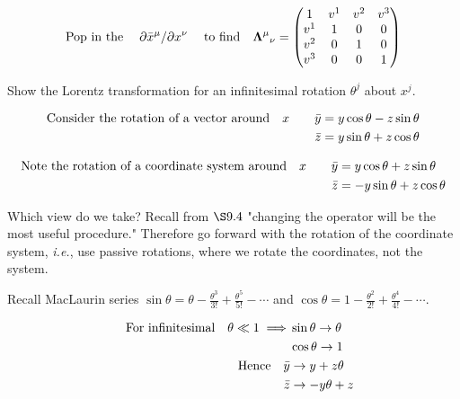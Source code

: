 \documentclass{article}
\begin{document}
\[ \qq*{Pop in the}\pdv*{\bar{x}^\mu}{x^\nu}\qq{to find}{\vb{\Lambda}^\mu}_\nu=\begin{pmatrix}1 & v^1 & v^2 & v^3 \\v^1&1&0&0\\v^2&0&1&0\\v^3&0&0&1\\
	\end{pmatrix}\]

Show the Lorentz transformation for an infinitesimal rotation $\theta^j$ about $x^j$. 

\begin{align*}
	\qq*{Consider the rotation of a vector around}x\qquad
	\bar{y} & =y\cos\theta-z\sin\theta \\
	\bar{z} & =y\sin\theta+z\cos\theta
\end{align*}

\begin{align*}
	\qq*{Note the rotation of a coordinate system around}x\qquad
	\bar{y} & =y\cos\theta+z\sin\theta  \\
	\bar{z} & =-y\sin\theta+z\cos\theta
\end{align*}

Which view do we take? Recall from $\S9.4$ "changing the operator will be the most useful procedure." Therefore go forward with the rotation of the coordinate system, \textit{i.e.}, use passive rotations, where we rotate the coordinates, not the system.

Recall MacLaurin series $\sin\theta=\theta-\frac{\theta^3}{3!}+\frac{\theta^5}{5!}-\cdots$ and $\cos\theta=1-\frac{\theta^2}{2!}+\frac{\theta^4}{4!}-\cdots$.

\begin{align*}
	\qq{For infinitesimal}\theta\ll1\implies & \sin\theta\to\theta \\
	                                         & \cos\theta\to 1     \\
	\qq{Hence}\bar{y}                        & \to y+z\theta       \\
	\bar{z}                                  & \to -y\theta+z      \\
\end{align*}
\end{document}
